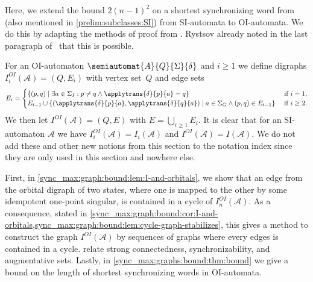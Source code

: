 
Here, we extend the bound $2(n-1)^2$ on a shortest synchronizing 
word from~\cite{Rystsov2000} (also mentioned in \cref{prelim:subclasses:SI})
from SI-automata to OI-automata. We do this by adapting the methods
of proof from \cite{Rystsov2000}. Rystsov already noted in the last paragraph 
of~\cite{Rystsov2000} that this is possible.

For an OI-automaton $\semiautomat{A}{Q}{\Sigma}{\delta}$ and $i \ge 1$
we define digraphs $I_i^{OI}(\mathcal A) = (Q, E_i)$
with vertex set~$Q$ and edge sets
\[
E_i = 
\begin{cases}
	\{ (p, q) \mid \exists a \in \Sigma_I : p \ne q \land \applytrans{\delta}{p}{a} = q\} & \text{ if } i = 1, \\
	E_{i-1} \cup \{ (\applytrans{\delta}{p}{a}, \applytrans{\delta}{q}{a}) \mid a \in \Sigma_G \land (p,q) \in E_{i-1} \} & \text{ if } i \ge 2.
\end{cases}
\]
We then let $I^{OI}(\mathcal A) = (Q, E)$ with $E = \bigcup_{i \ge 1} E_i$.
It is clear that for an SI-automaton $\mathcal A$
we have $I_i^{OI}(\mathcal A) = I_i(\mathcal A)$
and $I^{OI}(\mathcal A) = I(\mathcal A)$. 
We do not add these and other new notions from this section to the notation index
since they are only used in this section and nowhere else.


First, in \cref{sync_max:graph:bound:lem:I-and-orbitals}, we show that an edge from the orbital digraph
of two states, where one is mapped to the other by some idempotent one-point singular,
is contained in a cycle of $I_n^{OI}(\mathcal A)$.
As a consequence, stated in \cref{sync_max:graph:bound:cor:I-and-orbitals,sync_max:graph:bound:lem:cycle-graph-stabilizes}, 
this gives a method to construct the graph $I^{OI}(\mathcal A)$ by sequences of graphs
where every edges is contained in a cycle.
 relate strong connectedness, synchronizability, and augmentative sets.
Lastly, in \cref{sync_max:graphs:bound:thm:bound} we give
a bound on the length of shortest synchronizing words in OI-automata.


